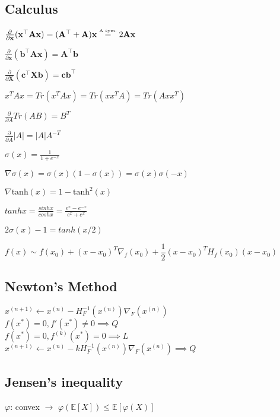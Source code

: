 \subsection*{Calculus}
\begin{inparaitem}[\color{red}\textbullet]
	\item $\frac{\partial}{\partial \mathbf{x}}(\mathbf{x}^\top \mathbf{A}\mathbf{x}) = (\mathbf{A}^\top + \mathbf{A})\mathbf{x} \stackrel{\text{\tiny A sym.}}{=} 2\mathbf{A}\mathbf{x}$ \\
	\item $\frac{\partial}{\partial \mathbf{x}}(\mathbf{b}^\top \mathbf{A}\mathbf{x}) = \mathbf{A}^\top \mathbf{b}$
	\item $\frac{\partial}{\partial \mathbf{X}}(\mathbf{c}^\top \mathbf{X} \mathbf{b}) = \mathbf{c}\mathbf{b}^\top$ \\
	\item $x^T A x = Tr(x^T A x) = Tr(x x^T A) = Tr(A x x^T)$ \\
	\item $\tfrac{\partial}{\partial A} Tr(AB) {=} B^T$
	\item $\frac{\partial}{\partial A}|A| {=}|A| A^{-T}$ \\
	\item $\sigma(x) = \frac{1}{1+e^{-x}}$ \\
	\item $\nabla \sigma(x) = \sigma(x)(1-\sigma(x)) = \sigma(x)\sigma(-x)$\\
	\item $\nabla \text{tanh}(x) = 1-\text{tanh}^2(x)$ \\
	\item $tanhx {=} \frac{sinhx}{coshx} {=} \frac{e^{x}-e^{-x}}{e^{x} + e^{x}}$
	\item $2\sigma(x)-1 = tanh(x/2)$
	\item $f(x) \sim f(x_0) + (x-x_0)^T \nabla_f(x_0) + \dfrac{1}{2}(x-x_0)^T H_f(x_0)(x-x_0)$
\end{inparaitem}
\subsection*{Newton's Method}
$x^{(n+1)} \gets x^{(n)}-H^{-1}_F(x^{(n)})\nabla_{F}(x^{(n)})$\\
$f(x^*)=0, f'(x^*) \neq 0 \implies Q$\\
$f(x^*)=0,f^{(k)}(x^*)=0 \implies L$\\
$x^{(n+1)} \gets x^{(n)}-kH^{-1}_F(x^{(n)})\nabla_{F}(x^{(n)}) \implies Q$



\subsection*{Jensen's inequality}
	$\varphi$: convex  $\rightarrow$ $\varphi(\mathbb{E}[X]) \leq \mathbb{E}[\varphi(X)]$
